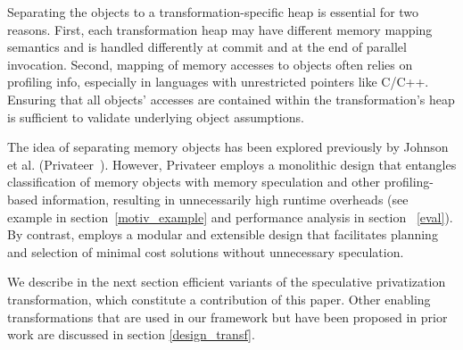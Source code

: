 Separating the objects to a transformation-specific heap is essential
for two reasons. First, each transformation heap may have different
memory mapping semantics and is handled differently at commit and at
the end of parallel invocation. Second, mapping of memory accesses to
objects often relies on profiling info, especially in languages with
unrestricted pointers like C/C++. Ensuring that all objects' accesses
are contained within the transformation's heap is sufficient to
validate underlying object assumptions.
%

The idea of separating memory objects has been explored previously by
Johnson et al. (Privateer~\cite{johnson:12:pldi}).  However, Privateer
employs a monolithic design that entangles classification of memory
objects with memory speculation and other
profiling-based information, resulting in unnecessarily high runtime
overheads (see example in section~\ref{motiv_example} and performance
analysis in section ~\ref{eval}).
%
By contrast, \name employs a modular and extensible design that
facilitates planning and selection of minimal cost solutions without
unnecessary speculation.
%



We describe in the next section efficient variants of the speculative
privatization transformation, which constitute a contribution of this
paper.  Other enabling transformations that are used in our framework
but have been proposed in prior work are discussed in
section \ref{design_transf}.

